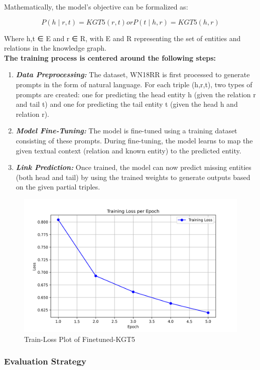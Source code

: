 \documentclass[12pt,a4paper]{article}
\begin{document}
Mathematically, the model's objective can be formalized as:

\begin{equation}
P(h∣r,t) = KGT5(r,t) or P(t∣h,r) = KGT5(h,r)
\end{equation}

Where h,t ∈ E and r ∈ R, with E and R representing the set of entities and relations in the knowledge graph.\\

\textbf{The training process is centered around the following steps:}\\
    \begin{enumerate} 
        \item \textbf{\textit{Data Preprocessing:}} The dataset, WN18RR \cite{yao2023exploring} is first processed to generate prompts in the form of natural language. For each triple (h,r,t), two types of prompts are created: one for predicting the head entity h (given the relation r and tail t) and one for predicting the tail entity t (given the head h and relation r). 
        \item \textit{\textbf{Model Fine-Tuning:}} The model is fine-tuned using a training dataset consisting of these prompts. During fine-tuning, the model learns to map the given textual context (relation and known entity) to the predicted entity. 
        \item \textbf{\textit{Link Prediction:}} Once trained, the model can now predict missing entities (both head and tail) by using the trained weights to generate outputs based on the given partial triples. 
    \end{enumerate}

\begin{figure}
    \centering
    \includegraphics[width=0.5\linewidth]{train_loss_plot.png}
    \caption{Train-Loss Plot of Finetuned-KGT5}
    \label{fig:kgt5_trainloss}
\end{figure}

\subsubsection{Evaluation Strategy}
\end{document}
